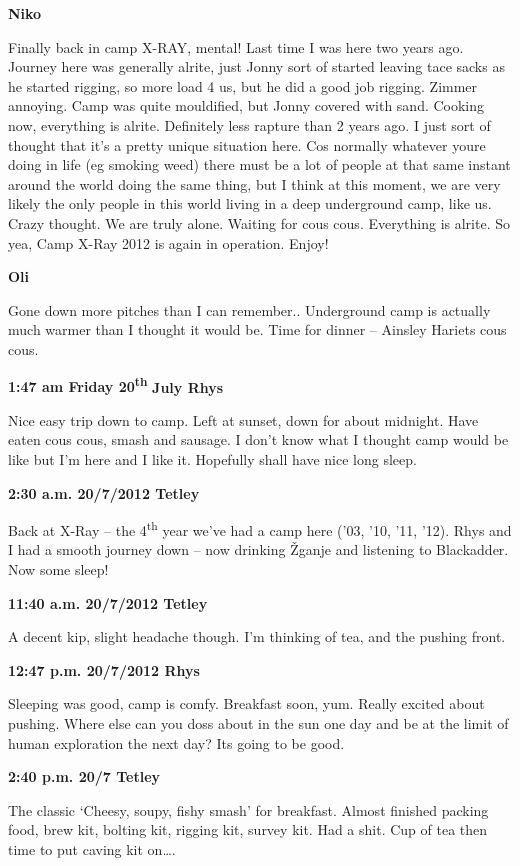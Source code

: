\textbf{Niko}

Finally back in camp X-RAY, mental! Last time I was here two years ago.
Journey here was generally alrite, just Jonny sort of started leaving
tace sacks as he started rigging, so more load 4 us, but he did a good
job rigging. Zimmer annoying. Camp was quite mouldified, but Jonny
covered with sand. Cooking now, everything is alrite. Definitely less
rapture than 2 years ago. I just sort of thought that it's a pretty
unique situation here. Cos normally whatever youre doing in life (eg
smoking weed) there must be a lot of people at that same instant around
the world doing the same thing, but I think at this moment, we are very
likely the only people in this world living in a deep underground camp,
like us. Crazy thought. We are truly alone. Waiting for cous cous.
Everything is alrite. So yea, Camp X-Ray 2012 is again in operation.
Enjoy!

\textbf{Oli}

Gone down more pitches than I can remember.. Underground camp is
actually much warmer than I thought it would be. Time for dinner --
Ainsley Hariets cous cous.

\textbf{1:47 am Friday 20\textsuperscript{th}} \textbf{July Rhys}

Nice easy trip down to camp. Left at sunset, down for about midnight.
Have eaten cous cous, smash and sausage. I don't know what I thought
camp would be like but I'm here and I like it. Hopefully shall have nice
long sleep.

\textbf{2:30 a.m. 20/7/2012 Tetley}

Back at X-Ray -- the 4\textsuperscript{th} year we've had a camp here
('03, '10, '11, '12). Rhys and I had a smooth journey down -- now
drinking Žganje and listening to Blackadder. Now some sleep!

\textbf{11:40 a.m. 20/7/2012 Tetley}

A decent kip, slight headache though. I'm thinking of tea, and the
pushing front.

\textbf{12:47 p.m. 20/7/2012 Rhys}

Sleeping was good, camp is comfy. Breakfast soon, yum. Really excited
about pushing. Where else can you doss about in the sun one day and be
at the limit of human exploration the next day? Its going to be good.

\textbf{2:40 p.m. 20/7 Tetley}

The classic `Cheesy, soupy, fishy smash' for breakfast. Almost finished
packing food, brew kit, bolting kit, rigging kit, survey kit. Had a
shit. Cup of tea then time to put caving kit on\ldots{}.

